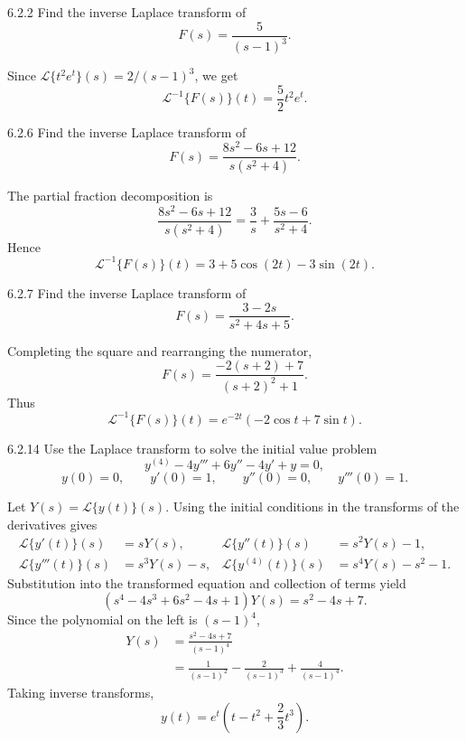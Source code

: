 \documentclass[11pt,oneside]{article}
\begin{document}
\begin{problem}{6.2.2}
Find the inverse Laplace transform of
\[
    F(s)=\frac{5}{(s-1)^3}.
\]
\end{problem}

\begin{solution}
Since $\mathcal{L}\{t^2e^t\}(s)=2/(s-1)^3$, we get
\[
    \boxed{\mathcal{L}^{-1}\{F(s)\}(t)=\frac52t^2e^t}.
\]
\end{solution}

\begin{problem}{6.2.6}
Find the inverse Laplace transform of
\[
    F(s)=\frac{8s^2-6s+12}{s(s^2+4)}.
\]
\end{problem}

\begin{solution}
The partial fraction decomposition is
\[
    \frac{8s^2-6s+12}{s(s^2+4)}
    =\frac{3}{s}+\frac{5s-6}{s^2+4}.
\]
Hence
\[
    \boxed{\mathcal{L}^{-1}\{F(s)\}(t)=3+5\cos(2t)-3\sin(2t)}.
\]
\end{solution}

\begin{problem}{6.2.7}
Find the inverse Laplace transform of
\[
    F(s)=\frac{3-2s}{s^2+4s+5}.
\]
\end{problem}

\begin{solution}
Completing the square and rearranging the numerator,
\[
    F(s)=\frac{-2(s+2)+7}{(s+2)^2+1}.
\]
Thus
\[
    \boxed{\mathcal{L}^{-1}\{F(s)\}(t)
    =e^{-2t}(-2\cos t+7\sin t)}.
\]
\end{solution}

\begin{problem}{6.2.14}
Use the Laplace transform to solve the initial value problem
\[
    y^{(4)}-4y'''+6y''-4y'+y=0,
\]
\[
    y(0)=0, \qquad y'(0)=1, \qquad y''(0)=0, \qquad y'''(0)=1.
\]
\end{problem}

\begin{solution}
Let $Y(s)=\mathcal{L}\{y(t)\}(s)$. Using the initial conditions in the transforms of the derivatives gives
\[
    \begin{aligned}
    \mathcal{L}\{y'(t)\}(s)&=sY(s), &
    \mathcal{L}\{y''(t)\}(s)&=s^2Y(s)-1,\\
    \mathcal{L}\{y'''(t)\}(s)&=s^3Y(s)-s, &
    \mathcal{L}\{y^{(4)}(t)\}(s)&=s^4Y(s)-s^2-1.
    \end{aligned}
\]
Substitution into the transformed equation and collection of terms yield
\[
    (s^4-4s^3+6s^2-4s+1)Y(s)=s^2-4s+7.
\]
Since the polynomial on the left is $(s-1)^4$,
\[
    \begin{aligned}
    Y(s)
       &=\frac{s^2-4s+7}{(s-1)^4}\\
       &=\frac{1}{(s-1)^2}-\frac{2}{(s-1)^3}
         +\frac{4}{(s-1)^4}.
    \end{aligned}
\]
Taking inverse transforms,
\[
    \boxed{y(t)=e^t\left(t-t^2+\frac23t^3\right)}.
\]
\end{solution}
\end{document}
